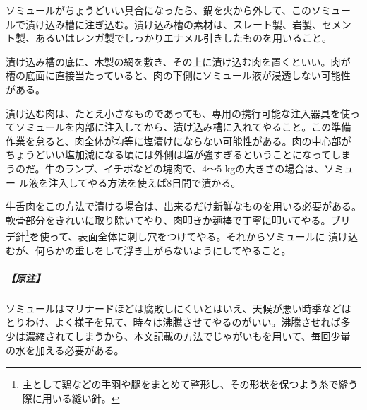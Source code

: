 \begin{recette}
ソミュールがちょうどいい具合になったら、鍋を火から外して、このソミュー
ルで漬け込み槽に注ぎ込む。漬け込み槽の素材は、スレート製、岩製、セメン
ト製、あるいはレンガ製でしっかりエナメル引きしたものを用いること。

漬け込み槽の底に、木製の網を敷き、その上に漬け込む肉を置くといい。肉が
槽の底面に直接当たっていると、肉の下側にソミュール液が浸透しない可能性
がある。

漬け込む肉は、たとえ小さなものであっても、専用の携行可能な注入器具を使っ
てソミュールを内部に注入してから、漬け込み槽に入れてやること。この準備
作業を怠ると、肉全体が均等に塩漬けにならない可能性がある。肉の中心部が
ちょうどいい塩加減になる頃には外側は塩が強すぎるということになってしま
うのだ。牛のランプ、イチボなどの塊肉で、4〜5
kgの大きさの場合は、ソミュー
ル液を注入してやる方法を使えば8日間で漬かる。

牛舌肉をこの方法で漬ける場合は、出来るだけ新鮮なものを用いる必要がある。
軟骨部分をきれいに取り除いてやり、肉叩きか麺棒で丁寧に叩いてやる。ブリ
デ針\footnote{主として鶏などの手羽や腿をまとめて整形し、その形状を保つよう糸で縫う際に用いる縫い針。}を使って、表面全体に刺し穴をつけてやる。それからソミュールに
漬け込むが、何らかの重しをして浮き上がらないようにしてやること。

\hypertarget{observation-grande-saumure}{%
\subparagraph{【原注】}\label{observation-grande-saumure}}

ソミュールはマリナードほどは腐敗しにくいとはいえ、天候が悪い時季などは
とりわけ、よく様子を見て、時々は沸騰させてやるのがいい。沸騰させれば多
少は濃縮されてしまうから、本文記載の方法でじゃがいもを用いて、毎回少量
の水を加える必要がある。
\end{recette}